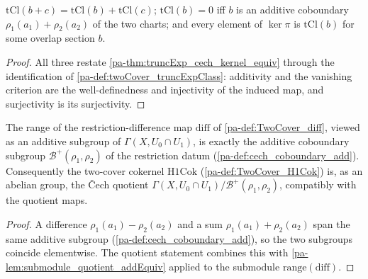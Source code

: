 \begin{lemma}
  \label{pa-lem:truncExpClass_props}
  \leanok

  \(\mathrm{tCl}(b + c) = \mathrm{tCl}(b) + \mathrm{tCl}(c)\);
  \(\mathrm{tCl}(b) = 0\) iff \(b\) is an additive coboundary
  \(\rho_1(a_1) + \rho_2(a_2)\) of the two charts; and every element of \(\ker \pi\) is
  \(\mathrm{tCl}(b)\) for some overlap section \(b\).
\end{lemma}
\begin{proof}
  \leanok
  All three restate \ref{pa-thm:truncExp_cech_kernel_equiv} through the identification of
  \ref{pa-def:twoCover_truncExpClass}: additivity and the vanishing criterion are the
  well-definedness and injectivity of the induced map, and surjectivity is its
  surjectivity.
\end{proof}

\begin{lemma}
  \label{pa-lem:range_diff_coboundaries}
  \leanok

  The range of the restriction-difference map \(\mathrm{diff}\) of
  \ref{pa-def:TwoCover_diff}, viewed as an additive subgroup of
  \(\Gamma(X, U_0 \cap U_1)\), is exactly the additive coboundary subgroup
  \(\mathcal B^+(\rho_1, \rho_2)\) of the restriction datum
  (\ref{pa-def:cech_coboundary_add}). Consequently the two-cover cokernel
  \(\mathrm{H1Cok}\) (\ref{pa-def:TwoCover_H1Cok}) is, as an abelian group, the \v{C}ech
  quotient \(\Gamma(X, U_0 \cap U_1) / \mathcal B^+(\rho_1, \rho_2)\), compatibly with
  the quotient maps.
\end{lemma}
\begin{proof}
  \leanok
  A difference \(\rho_1(a_1) - \rho_2(a_2)\) and a sum \(\rho_1(a_1) + \rho_2(a_2)\)
  span the same additive subgroup (\ref{pa-def:cech_coboundary_add}), so the two subgroups
  coincide elementwise. The quotient statement combines this with
  \ref{pa-lem:submodule_quotient_addEquiv} applied to the submodule
  \(\mathrm{range}(\mathrm{diff})\).
\end{proof}

